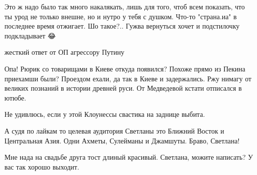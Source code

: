 \begin{itemize}
Это ж надо было так много накалякать, лишь для того, чтоб всем показать, что ты урод не только внешне, но и нутро у тебя с душком.
Что-то "страна.иа" в последнее время отжигает.
Шо такое?.. Гужва вернуться хочет и подстилочку подкладывает 😂

 
жесткий ответ от ОП агрессору Путину🤣

 

Опа! Рюрик со товарищами в Киеве откуда появился? Похоже прямо из Пекина
приехамши были? Проездом ехали, да так в Киеве и задержались. Ржу нимагу от
великих познаний в истории древней руси. От Медведевой кстати отписался в
ютюбе.


 
Не удивлюсь, если у этой Клоунессы свастика на заднице выбита.

 

А судя по лайкам то целевая аудитория Светланы это Ближний Восток и Центральная
Азия. Одни Ахметы, Сулейманы и Джамшуты. Браво, Светлана!

 
Мне нада на свадьбе друга тост длиный красивый. Светлана, можите написать? У вас так хорошо выходит.

 


\end{itemize}
